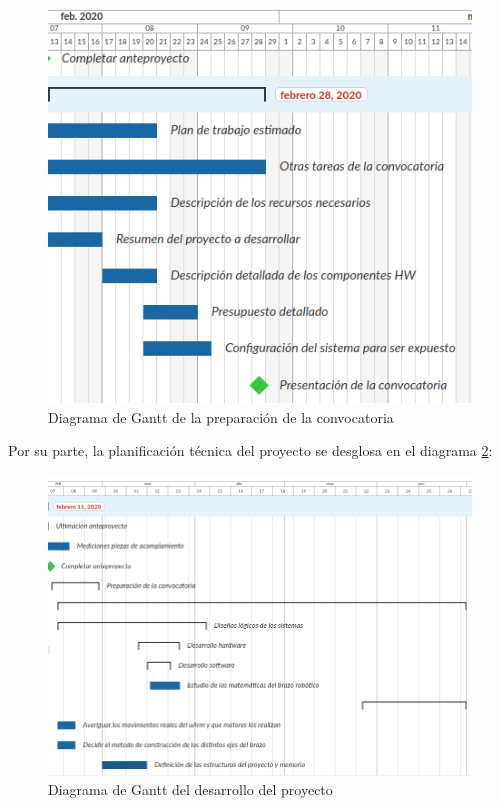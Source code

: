 \begin{figure}[H]
    \centering
    \includegraphics[width=1\linewidth]{pictures/PreparacionConvocatoria.png}
    \caption{Diagrama de Gantt de la preparación de la convocatoria}
    \label{fig:gantt_convocatoria}
\end{figure}

Por su parte, la planificación técnica del proyecto se desglosa en el diagrama
\ref{fig:gantt_proyecto}:

\begin{figure}[H]
    \centering
    \includegraphics[width=1\linewidth]{pictures/DesarrolloProyecto.png}
    \caption{Diagrama de Gantt del desarrollo del proyecto}
    \label{fig:gantt_proyecto}
\end{figure}


